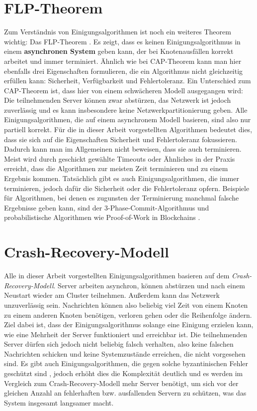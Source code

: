 \section{FLP-Theorem}

Zum Verständnis von Einigungsalgorithmen ist noch ein weiteres Theorem wichtig: Das FLP-Theorem \cite{flp}. Es zeigt, dass es keinen Einigungsalgorithmus in einem \textbf{asynchronen System} geben kann, der bei Knotenausfällen korrekt arbeitet und immer terminiert. Ähnlich wie bei CAP-Theorem kann man hier ebenfalls drei Eigenschaften formulieren, die ein Algorithmus nicht gleichzeitig erfüllen kann: Sicherheit, Verfügbarkeit und Fehlertoleranz. Ein Unterschied zum CAP-Theorem ist, dass hier von einem schwächeren Modell ausgegangen wird: Die teilnehmenden Server können zwar abstürzen, das Netzwerk ist jedoch zuverlässig und es kann insbesondere keine Netzwerkpartitionierung geben.
Alle Einigungsalgorithmen, die auf einem asynchronem Modell basieren, sind also nur partiell korrekt. Für die in dieser Arbeit vorgestellten Algorithmen bedeutet dies, dass sie sich auf die Eigenschaften Sicherheit und Fehlertoleranz fokussieren. Dadurch kann man im Allgemeinen nicht beweisen, dass sie auch terminieren. Meist wird durch geschickt gewählte Timeouts oder Ähnliches in der Praxis erreicht, dass die Algorithmen zur meisten Zeit terminieren und zu einem Ergebnis kommen.
Tatsächlich gibt es auch Einigungsalgorithmen, die immer terminieren, jedoch dafür die Sicherheit oder die Fehlertoleranz opfern. Beispiele für Algorithmen, bei denen es zugunsten der Terminierung manchmal falsche Ergebnisse geben kann, sind der 3-Phase-Commit-Algorithmus \cite{pc} und probabilistische Algorithmen wie Proof-of-Work in Blockchains .


\section{Crash-Recovery-Modell}

Alle in dieser Arbeit vorgestellten Einigungsalgorithmen basieren auf dem \textit{Crash-Recovery-Modell}. Server arbeiten asynchron, können abstürzen und nach einem Neustart wieder am Cluster teilnehmen. Außerdem kann das Netzwerk unzuverlässig sein. Nachrichten können also beliebig viel Zeit von einem Knoten zu einem anderen Knoten benötigen, verloren gehen oder die Reihenfolge ändern. Ziel dabei ist, dass der Einigungsalgorithmus solange eine Einigung erzielen kann, wie eine Mehrheit der Server funktioniert und erreichbar ist. Die teilnehmenden Server dürfen sich jedoch nicht beliebig falsch verhalten, also keine falschen Nachrichten schicken und keine Systemzustände erreichen, die nicht vorgesehen sind. Es gibt auch Einigungsalgorithmen, die gegen solche byzantinischen Fehler geschützt sind \cite{byzantine-paxos}, jedoch erhöht dies die Komplexität deutlich und es werden im Vergleich zum Crash-Recovery-Modell mehr Server benötigt, um sich vor der gleichen Anzahl an fehlerhaften bzw. ausfallenden Servern zu schützen, was das System insgesamt langsamer macht.

